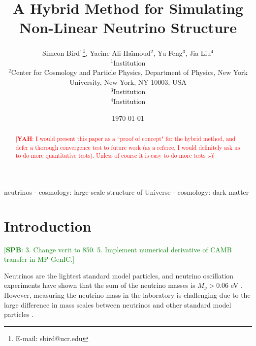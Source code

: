\documentclass[useAMS, usenatbib]{mnras}
\newcommand{\spb}[1]{{\textcolor{green}{[{\bf SPB}: #1]}}}
\newcommand{\yah}[1]{{\textcolor{red}{[{\bf YAH}: #1]}}}
\begin{document}
\title{A Hybrid Method for Simulating Non-Linear Neutrino Structure}
\author[ S. Bird et al.]{  Simeon Bird$^1$\thanks{E-mail: sbird@ucr.edu}, Yacine Ali-Ha\"{\i}moud$^2$, Yu Feng$^3$, Jia Liu$^4$\vspace{1.5mm}\\
$^1$Institution\\
$^2$Center for Cosmology and Particle Physics, Department of Physics,
New York University, New York, NY 10003, USA\\
$^3$Institution\\
$^4$Institution}

\date{\today}

\pagerange{\pageref{firstpage}--\pageref{lastpage}} 
\label{firstpage}

\maketitle

\begin{abstract}
\yah{I would present this paper as a ``proof of concept" for the hybrid method, and defer a thorough convergence test to future work (as a referee, I would definitely ask us to do more quantitative tests). Unless of course it is easy to do more tests :-)}

\end{abstract}

\begin{keywords}
        neutrinos - cosmology: large-scale structure of Universe - cosmology: dark matter
\end{keywords}

\section{Introduction}

\spb{3. Change vcrit to 850. 5. Implement numerical derivative of CAMB transfer in MP-GenIC.}


Neutrinos are the lightest standard model particles, and neutrino oscillation experiments have shown that the sum of the neutrino masses is $M_\nu > 0.06$ eV \citep{Becker-Szendy_1992, Fukuda_1998}.
However, measuring the neutrino mass in the laboratory is challenging due to the large difference in mass scales between neutrinos and other standard model particles \cite[although see][]{Wolf_2010}.
\end{document}
